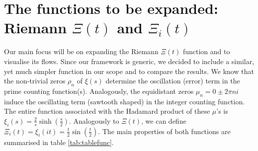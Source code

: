 \documentclass[a4paper,11pt,twoside]{amsart}
\newcommand{\verifiedeq}{=}
\newcommand{\defeq}{=}
\newcommand{\verifiedeq}{\stackrel{\checkmark}{=}}
\newcommand{\defeq}{\stackrel{\scriptscriptstyle \textnormal{def}}{=}}
\begin{document}
\section{The functions to be expanded: Riemann $\Xi(t)$ and $\Xi_i(t)$} \label{functobexpanded}
Our main focus will be on expanding the Riemann $\Xi(t)$ function and to visualise its flows. Since our framework is generic, we decided to include a similar, yet much simpler function in our scope and to compare the results. We know that the non-trivial zeros $\rho_n$ of $\xi(s)$ determine the oscillation (error) term in the prime counting function(s). Analogously, the equidistant zeros $\mu_n\verifiedeq 0 \pm 2\pi n i$ induce the oscillating term (sawtooth shaped) in the integer counting function. The entire function associated with the Hadamard product of these $\mu$'s is $\xi_i(s) \defeq \frac{2}{s}\sinh\left(\frac{s}{2}\right)$. Analogously to $\Xi(t)$, we can define $\Xi_i(t) \defeq  \xi_i\left(it\right) \defeq \frac{t}{2}\sin\left(\frac{t}{2}\right)$. The main properties of both functions are summarised in table \ref{tab:tablefunc}.
\end{document}
